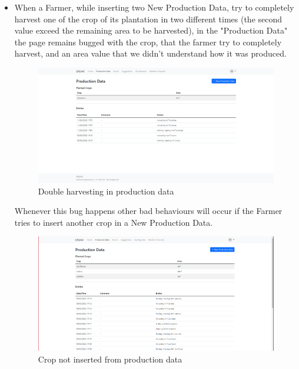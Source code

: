 \begin{itemize}
    \item When a Farmer, while inserting two New Production Data, try to completely harvest one of the crop of its plantation in two different times (the second value exceed the remaining area to be harvested), in the "Production Data" the page remains bugged with the crop, that the farmer try to completely harvest, and an area value that we didn't understand how it was produced.
    \begin{figure}[h!]
        \centering
        \includegraphics[scale=0.25]{images/additional_notes/fail_inserting_double_production_harvesting.png}
        \caption{Double harvesting in production data}
        \label{fig:double_harvesting_production_data}
    \end{figure}
   \FloatBarrier
    Whenever this bug happens other bad behaviours will occur if the Farmer tries to insert another crop in a New Production Data.
    \begin{figure}[h!]
        \centering
        \includegraphics[scale=0.25]{images/additional_notes/insert_something_not_present_in_production_data.png}
        \caption{Crop not inserted from production data}
        \label{fig:fail_insert_data_from_production_data}
    \end{figure}

\end{itemize}
